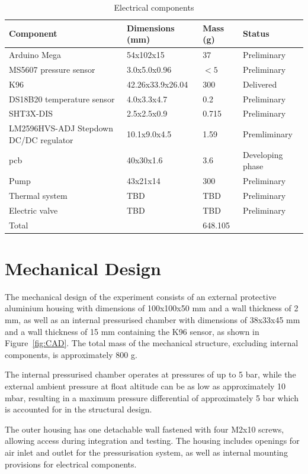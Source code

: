 \documentclass[12pt,a4paper]{report}
\newcommand{\fref}[1]{Figure~\ref{#1}}
\begin{document}
\begin{table}[H]
\centering
\caption{Electrical components}
\label{tab:electrical_components}
\begin{tabular}{p{4cm}p{4cm}ll}
\hline
\textbf{Component} & \textbf{Dimensions (mm)} & \textbf{Mass (g)} & \textbf{Status} \\
\hline
Arduino Mega & 54x102x15 & 37 & Preliminary\\
MS5607 pressure sensor & 3.0x5.0x0.96 & $<5$ & Preliminary\\
K96 & 42.26x33.9x26.04 & 300 & Delivered \\
DS18B20 temperature sensor & 4.0x3.3x4.7 & 0.2 & Preliminary \\
SHT3X-DIS & 2.5x2.5x0.9 & 0.715 & Preliminary \\
LM2596HVS-ADJ Stepdown DC/DC regulator & 10.1x9.0x4.5 & 1.59 & Premliminary \\
\ac{pcb} & 40x30x1.6 & 3.6 & Developing phase \\
Pump & 43x21x14 & 300 & Preliminary \\
Thermal system & TBD & TBD & Preliminary \\
Electric valve & TBD & TBD & Preliminary \\
\hline
Total & & 648.105 & \\
\hline
\end{tabular}
\end{table}

\section{Mechanical Design}


The mechanical design of the experiment consists of an external protective aluminium housing with dimensions of 100x100x50 mm and a wall thickness of 2 mm, as well as an internal pressurised chamber with dimensions of 38x33x45 mm and a wall thickness of 15 mm containing the K96 sensor, as shown in \fref{fig:CAD}. The total mass of the mechanical structure, excluding internal components, is approximately 800 g.

The internal pressurised chamber operates at pressures of up to 5 bar, while the external ambient pressure at float altitude can be as low as approximately 10 mbar, resulting in a maximum pressure differential of approximately 5 bar which is accounted for in the structural design.

The outer housing has one detachable wall fastened with four M2x10 screws, allowing access during integration and testing. The housing includes openings for air inlet and outlet for the pressurisation system, as well as internal mounting provisions for electrical components.
\end{document}
